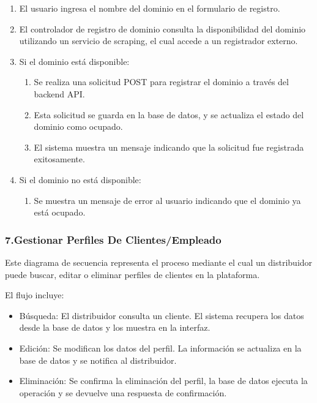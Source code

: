 \begin{enumerate}
    \item El usuario ingresa el nombre del dominio en el formulario de registro.
    \item El controlador de registro de dominio consulta la disponibilidad del dominio utilizando un servicio de scraping, el cual accede a un registrador externo.
    \item Si el dominio está disponible:
    \begin{enumerate}
        \item Se realiza una solicitud POST para registrar el dominio a través del backend API.
        \item Esta solicitud se guarda en la base de datos, y se actualiza el estado del dominio como ocupado.
        \item El sistema muestra un mensaje indicando que la solicitud fue registrada exitosamente.
    \end{enumerate}

    \item Si el dominio no está disponible:
    \begin{enumerate}
    	\item Se muestra un mensaje de error al usuario indicando que el dominio ya está ocupado.
    \end{enumerate}
\end{enumerate}

\subsubsection*{7.Gestionar Perfiles De Clientes/Empleado}

Este diagrama de secuencia representa el proceso mediante el cual un distribuidor puede buscar, editar o eliminar perfiles de clientes en la plataforma.

El flujo incluye:

\begin{itemize}
    \item Búsqueda: El distribuidor consulta un cliente. El sistema recupera los datos desde la base de datos y los muestra en la interfaz.

    \item Edición: Se modifican los datos del perfil. La información se actualiza en la base de datos y se notifica al distribuidor.

    \item Eliminación: Se confirma la eliminación del perfil, la base de datos ejecuta la operación y se devuelve una respuesta de confirmación.
\end{itemize}

